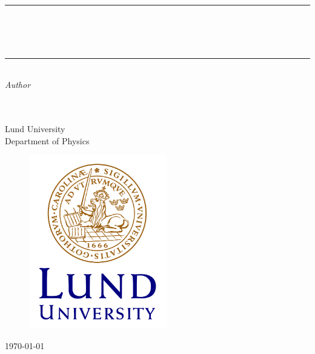 \begin{titlepage}
    \vspace*{\fill}	\newcommand{\HRule}{\rule{\linewidth}{0.5mm}}
	\center 
	\HRule\\[0.4cm]
	{\huge\bfseries \nameoflab}\\[0.4cm]
        {\Large\bfseries \coursecode}\\[0.1cm]
	\HRule\\[1.5cm]

    \large
    \textit{Author}\\
    \authorOne  \\ \texttt{\authorOneMail} \\
    
    \vspace{1cm}
     
    Lund University\\
    Department of Physics
     
    
    \begin{figure}[H]
        \centering        
        \includegraphics[width=6cm]{format/lund.png}
    \end{figure}
    
    \bigbreak
    \vfill
    \today
\end{titlepage}